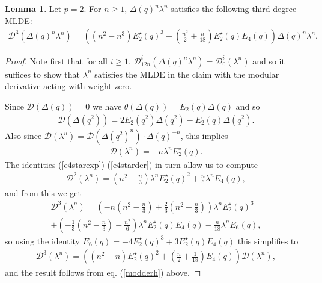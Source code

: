 \documentclass[10pt,a4paper]{amsart}
\numberwithin{equation}{section}
\theoremstyle{definition}
\newtheorem{Lemma}[Th]{Lemma}
\newcommand{\haupt}{\lambda}
\begin{document}
\begin{Lemma} \label{Lemma: hdiffeq}
Let $p=2$. For $n \geq 1$, $\Delta (q)^{n} \haupt^{n}$ satisfies the following third-degree MLDE:
\begin{align}
    \mathcal{D}^{3} \left( \Delta (q)^{n} \haupt^{n} \right) = \left( \left( n^{2} - n^{3} \right) E_{2}^{\star}(q)^{3} - \left( \frac{n^{2}}{2} + \frac{n}{18} \right) E_{2}^{\star}(q)E_{4}(q) \right) \Delta (q)^{n} \haupt^{n}.\label{hdiffeq}
\end{align}
\end{Lemma}
\begin{proof}
Note first that for all $i \geq 1$, $\mathcal{D}_{12n}^{i}(\Delta (q)^{n} \haupt^{n}) = \mathcal{D}_{0}^{i}(\haupt^{n})$ and so it suffices to show that $\haupt^{n}$ satisfies the MLDE in the claim with the modular derivative acting with weight zero. 

Since $\mathcal{D}( \Delta (q) ) = 0$ we have $\theta (\Delta (q)) = E_{2}(q) \Delta (q)$ and so
\begin{align*}
    \mathcal{D}(\Delta (q^{2})) = 2 E_{2}(q^{2}) \Delta (q^{2})  - E_{2}(q) \Delta ( q^{2}).
\end{align*}
Also since $\mathcal{D}(\haupt^{n}) = \mathcal{D}(\Delta ( q^{2} )^{n}) \cdot \Delta (q)^{-n}$, this implies
\begin{align}
    \mathcal{D}(\haupt^{n}) = -n \haupt^{n}E_{2}^{\star}(q). \label{modderh}
\end{align}
The identities (\ref{e4starexp})-(\ref{e4starder}) in turn allow us to compute
\begin{align*}
    \mathcal{D}^{2}\left( \haupt^{n} \right) = \left( n^{2} - \frac{n}{3} \right) \haupt^{n} E_{2}^{\star}(q)^{2} + \frac{n}{6} \haupt^{n} E_{4}(q),
\end{align*}
and from this we get
\begin{multline*}
    \mathcal{D}^{3} \left( \haupt^{n} \right) = \left( -n \left( n^{2} - \frac{n}{3} \right) + \frac{2}{3} \left( n^{2} - \frac{n}{3} \right) \right) \haupt^{n} E_{2}^{\star}(q)^{3} \\ + \left( - \frac{1}{3} \left( n^{2} - \frac{n}{3} \right) - \frac{n^{2}}{6} \right) \haupt^{n} E_{2}^{\star}(q) E_{4}(q) - \frac{n}{18} \haupt^{n} E_{6}(q),
\end{multline*}
so using the identity $E_{6}(q) = -4 E_{2}^{\star}(q)^{3} + 3 E_{2}^{\star}(q) E_{4}(q)$ this simplifies to
\begin{align*}
    \mathcal{D}^{3} \left( \haupt^{n} \right) = \left( \left( n^{2} - n \right) E_{2}^{\star}(q)^{2} + \left( \frac{n}{2} + \frac{1}{18} \right) E_{4}(q) \right) \mathcal{D}(\haupt^{n}),
\end{align*}
and the result follows from eq. (\ref{modderh}) above.
\end{proof}
\end{document}
